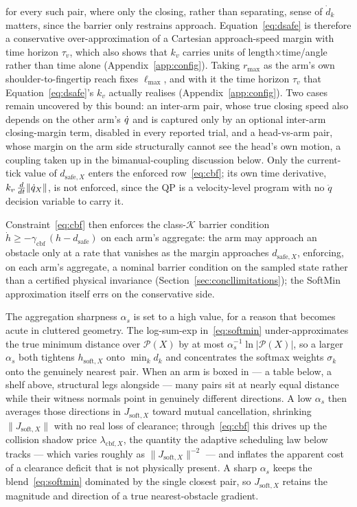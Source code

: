 for every such pair, where only the closing, rather than separating, sense of $\dot{d}_k$ matters, since the barrier only restrains approach. Equation~\eqref{eq:dsafe} is therefore a conservative over-approximation of a Cartesian approach-speed margin with time horizon $\tau_v$, which also shows that $k_v$ carries units of length$\times$time/angle rather than time alone (Appendix~\ref{app:config}). Taking $r_{\max}$ as the arm's own shoulder-to-fingertip reach fixes $\ell_{\max}$, and with it the time horizon $\tau_v$ that Equation~\eqref{eq:dsafe}'s $k_v$ actually realises (Appendix~\ref{app:config}). Two cases remain uncovered by this bound: an inter-arm pair, whose true closing speed also depends on the other arm's $\dot{q}$ and is captured only by an optional inter-arm closing-margin term, disabled in every reported trial, and a head-vs-arm pair, whose margin on the arm side structurally cannot see the head's own motion, a coupling taken up in the bimanual-coupling discussion below. Only the current-tick value of $d_{\text{safe},X}$ enters the enforced row~\eqref{eq:cbf}; its own time derivative, $k_v\,\frac{d}{dt}\|\dot{q}_X\|$, is not enforced, since the QP is a velocity-level program with no $\ddot{q}$ decision variable to carry it.

Constraint~\eqref{eq:cbf} then enforces the class-$\mathcal{K}$ barrier condition $\dot{h} \ge -\gamma_{\text{cbf}}\,(h - d_{\text{safe}})$ on each arm's aggregate: the arm may approach an obstacle only at a rate that vanishes as the margin approaches $d_{\text{safe},X}$, enforcing, on each arm's aggregate, a nominal barrier condition on the sampled state rather than a certified physical invariance (Section~\ref{sec:concllimitations}); the SoftMin approximation itself errs on the conservative side.

The aggregation sharpness $\alpha_s$ is set to a high value, for a reason that becomes acute in cluttered geometry. The log-sum-exp in~\eqref{eq:softmin} under-approximates the true minimum distance over $\mathcal{P}(X)$ by at most $\alpha_s^{-1}\ln|\mathcal{P}(X)|$, so a larger $\alpha_s$ both tightens $h_{\text{soft},X}$ onto $\min_k d_k$ and concentrates the softmax weights $\sigma_k$ onto the genuinely nearest pair. When an arm is boxed in --- a table below, a shelf above, structural legs alongside --- many pairs sit at nearly equal distance while their witness normals point in genuinely different directions. A low $\alpha_s$ then averages those directions in $J_{\text{soft},X}$ toward mutual cancellation, shrinking $\|J_{\text{soft},X}\|$ with no real loss of clearance; through~\eqref{eq:cbf} this drives up the collision shadow price $\lambda_{\text{cbf},X}$, the quantity the adaptive scheduling law below tracks --- which varies roughly as $\|J_{\text{soft},X}\|^{-2}$ --- and inflates the apparent cost of a clearance deficit that is not physically present. A sharp $\alpha_s$ keeps the blend~\eqref{eq:softmin} dominated by the single closest pair, so $J_{\text{soft},X}$ retains the magnitude and direction of a true nearest-obstacle gradient.

